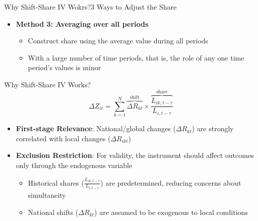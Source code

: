 \documentclass[dvipsnames,hyperref={pdfpagelabels=false}]{beamer}
\begin{document}
\begin{frame}{Why Shift-Share IV Wokrs?}{3 Ways to Adjust the Share}
		\begin{itemize}
	\item \textbf{Method 3: Averaging over all periods}
			\vspace{0.2cm}
	\begin{itemize}
		\item Construct share using the average value during all periods
			\vspace{0.2cm}

			\item With a large number of time periods, that is, the role of any one time period's values is minor

		
		\end{itemize}

	\end{itemize}
\end{frame}






\begin{frame}{Why Shift-Share IV Works?}
	\[ \Delta Z_{it}=\sum_{k=1}^{N} \overbrace{\Delta R_{kt}}^{\text{shift}} \times \overbrace{\frac{L_{ik,t-\tau}}{L_{i,t-\tau}}}^{\text{share}} \]
	\begin{itemize}
		\item \textbf{First-stage Relevance}: National/global changes ($\Delta R_{kt}$) are strongly correlated with local changes ($\Delta R_{ikt}$)
		\vspace{0.2cm}
		\item \textbf{Exclusion Restriction}: For validity, the instrument should affect outcomes only through the endogenous variable
				\vspace{0.2cm}
		\begin{itemize}
			\item Historical shares ($\frac{L_{ik,t-\tau}}{L_{i,t-\tau}}$) are predetermined, reducing concerns about simultaneity
					\vspace{0.2cm}
			\item National shifts ($\Delta R_{kt}$) are assumed to be exogenous to local conditions
		\end{itemize}
	\end{itemize}
\end{frame}
\end{document}
